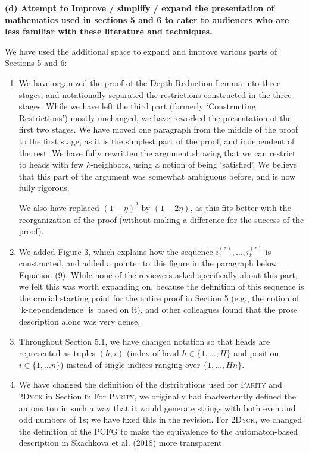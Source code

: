 \documentclass[11pt,a4paper]{article}
\newcommand\response[1]{{\color{blue}#1}}
\newcommand\original[1]{\textbf{#1}}
\begin{document}
\original{(d) Attempt to Improve / simplify / expand the presentation of mathematics
used in sections 5 and 6 to cater to audiences who are less familiar with
these literature and techniques.}

\response{We have used the additional space to expand and improve various parts of Sections 5 and 6:}

\begin{enumerate}
\item \response{We have organized the proof of the Depth Reduction Lemma into three stages, and notationally separated the restrictions constructed in the three stages. While we have left the third part (formerly `Constructing Restrictions') mostly unchanged, we have reworked the presentation of the first two stages. We have moved one paragraph from the middle of the proof to the first stage, as it is the simplest part of the proof, and independent of the rest. We have fully rewritten the argument showing that we can restrict to heads with few $k$-neighbors, using a notion of being `satisfied'. We believe that this part of the argument was somewhat ambiguous before, and is now fully rigorous.}

\response{We also have replaced $(1-\eta)^2$ by $(1-2\eta)$, as this fits better with the reorganization of the proof (without making a difference for the success of the proof).}

\item \response{We added Figure 3, which explains how the sequence $i^{(z)}_1, \dots, i^{(z)}_k$ is constructed, and added a pointer to this figure in the paragraph below Equation (9). While none of the reviewers asked specifically about this part, we felt this was worth expanding on, because the definition of this sequence is the crucial starting point for the entire proof in Section 5 (e.g., the notion of `k-dependendence' is based on it), and other colleagues found that the prose description alone was very dense.}

\item \response{Throughout Section 5.1, we have changed notation so that heads are represented as tuples $(h,i)$ (index of head $h \in \{1,\dots, H\}$ and position $i \in \{1, \dots n\}$) instead of single indices ranging over $\{1, \dots, Hn\}$.}

\item \response{We have changed the definition of the distributions used for \textsc{Parity} and \textsc{2Dyck} in Section 6: For \textsc{Parity}, we originally had inadvertently defined the automaton in such a way that it would generate strings with both even and odd numbers of $1$s; we have fixed this in the revision. For \textsc{2Dyck}, we changed the definition of the PCFG to make the equivalence to the automaton-based description in Skachkova et al. (2018) more transparent.}


\end{enumerate}
\end{document}
